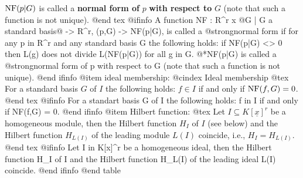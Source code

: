 \noindent
$\hbox{NF}(p|G)$ is called a {\bf normal form of} $p$ {\bf with
respect to} $G$ (note that such a function is not unique).
@end tex
@ifinfo
A function NF : R^r x @{G | G a standard basis@} -> R^r, (p,G) ->
NF(p|G), is called a @strong{normal form} if for any p in R^r and any
standard basis G the following holds: if NF(p|G) <> 0 then L(g) does not
divide L(NF(p|G)) for all g in G.
@*NF(p|G) is called a @strong{normal form} of p with respect to G (note
that such a function is not unique).
@end ifinfo
@item ideal membership:
@cindex Ideal membership
@tex
For a standard basis $G$ of $I$ the following holds: 
$f \in I$ if and only if $\hbox{NF}(f,G) = 0$.
@end tex
@ifinfo
For a standart basis G of I the following holds: 
f in I if and only if NF(f,G) = 0.
@end ifinfo
@item Hilbert function:
@tex
Let \hbox{$I \subseteq K[\underline{x}]^r$} be a homogeneous module, then the Hilbert function
$H_I$ of $I$ (see below)
and the Hilbert function $H_{L(I)}$ of the leading module $L(I)$
coincide, i.e.,
$H_I=H_{L(I)}$.
@end tex
@ifinfo
Let I in K[x]^r be a homogeneous ideal, then the Hilbert function H_I of I
and the Hilbert function H_L(I) of the leading ideal L(I) coincide.
@end ifinfo
@end table

